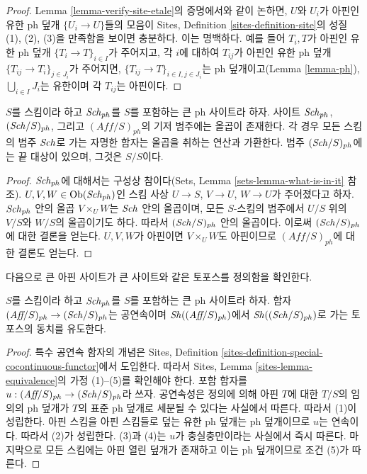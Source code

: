 \begin{proof}
Lemma \ref{lemma-verify-site-etale}의 증명에서와 같이 논하면, $U$와
$U_i$가 아핀인 유한 ph 덮개 $\{U_i \to U\}$들의 모음이 Sites,
Definition \ref{sites-definition-site}의 성질 (1), (2), (3)을 만족함을
보이면 충분하다. 이는 명백하다. 예를 들어 $T_i, T$가 아핀인 유한 ph
덮개 $\{T_i \to T\}_{i\in I}$가 주어지고, 각 $i$에 대하여 $T_{ij}$가
아핀인 유한 ph 덮개 $\{T_{ij} \to T_i\}_{j\in J_i}$가 주어지면,
$\{T_{ij} \to T\}_{i \in I, j\in J_i}$는 ph 덮개이고(Lemma
\ref{lemma-ph}), $\bigcup_{i\in I} J_i$는 유한이며 각 $T_{ij}$는 아핀이다.
\end{proof}

\begin{lemma}
\label{lemma-fibre-products-ph}
$S$를 스킴이라 하고 $\mathit{Sch}_{ph}$를 $S$를 포함하는 큰 ph 사이트라 하자.
사이트 $\mathit{Sch}_{ph}$, $(\mathit{Sch}/S)_{ph}$, 그리고 $(\textit{Aff}/S)_{ph}$의
기저 범주에는 올곱이 존재한다. 각 경우 모든 스킴의 범주 $\mathit{Sch}$로 가는
자명한 함자는 올곱을 취하는 연산과 가환한다. 범주 $(\mathit{Sch}/S)_{ph}$에는
끝 대상이 있으며, 그것은 $S/S$이다.
\end{lemma}

\begin{proof}
$\mathit{Sch}_{ph}$에 대해서는 구성상 참이다(Sets, Lemma
\ref{sets-lemma-what-is-in-it} 참조). $U, V, W \in \mathop{\mathrm{Ob}}\nolimits(\mathit{Sch}_{ph})$인
스킴 사상 $U \to S$, $V \to U$, $W \to U$가 주어졌다고 하자.
$\mathit{Sch}_{ph}$ 안의 올곱 $V \times_U W$는 $\mathit{Sch}$ 안의 올곱이며, 모든
$S$-스킴의 범주에서 $U/S$ 위의 $V/S$와 $W/S$의 올곱이기도 하다.
따라서 $(\mathit{Sch}/S)_{ph}$ 안의 올곱이다. 이로써 $(\mathit{Sch}/S)_{ph}$에 대한
결론을 얻는다. $U, V, W$가 아핀이면 $V \times_U W$도 아핀이므로
$(\textit{Aff}/S)_{ph}$에 대한 결론도 얻는다.
\end{proof}

\noindent
다음으로 큰 아핀 사이트가 큰 사이트와 같은 토포스를 정의함을
확인한다.

\begin{lemma}
\label{lemma-affine-big-site-ph}
$S$를 스킴이라 하고 $\mathit{Sch}_{ph}$를 $S$를 포함하는 큰 ph 사이트라 하자.
함자 $(\textit{Aff}/S)_{ph} \to (\mathit{Sch}/S)_{ph}$는 공연속이며
$\mathop{\mathit{Sh}}\nolimits((\textit{Aff}/S)_{ph})$에서 $\mathop{\mathit{Sh}}\nolimits((\mathit{Sch}/S)_{ph})$로 가는 토포스의
동치를 유도한다.
\end{lemma}

\begin{proof}
특수 공연속 함자의 개념은 Sites, Definition
\ref{sites-definition-special-cocontinuous-functor}에서 도입한다. 따라서
Sites, Lemma \ref{sites-lemma-equivalence}의 가정 (1)--(5)를 확인해야
한다. 포함 함자를
$u : (\textit{Aff}/S)_{ph} \to (\mathit{Sch}/S)_{ph}$라 쓰자. 공연속성은 정의에
의해 아핀 $T$에 대한 $T/S$의 임의의 ph 덮개가 $T$의 표준 ph 덮개로
세분될 수 있다는 사실에서 따른다. 따라서 (1)이 성립한다. 아핀 스킴을
아핀 스킴들로 덮는 유한 ph 덮개는 ph 덮개이므로 $u$는 연속이다.
따라서 (2)가 성립한다. (3)과 (4)는 $u$가 충실충만이라는 사실에서 즉시
따른다. 마지막으로 모든 스킴에는 아핀 열린 덮개가 존재하고 이는 ph
덮개이므로 조건 (5)가 따른다.
\end{proof}

